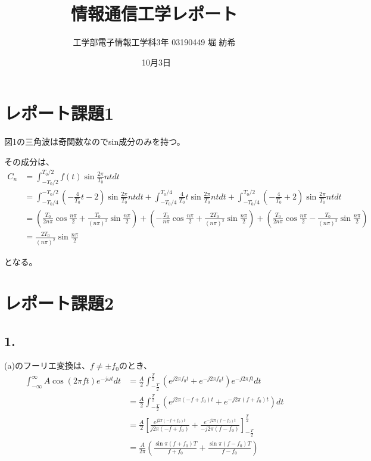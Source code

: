 \documentclass[dvipdfmx]{jsarticle}
\begin{document}
\title{情報通信工学レポート}
\author{工学部電子情報工学科3年 03190449  堀 紡希}
\date{\ 10月3日}
\maketitle

\section*{レポート課題1}

図1の三角波は奇関数なのでsin成分のみを持つ。

その成分は、
\begin{align*}
C_{n} &= \int _{-T_{0}/2} ^{T_{0}/2} f(t)\sin{\frac{2\pi }{T_{0}}nt dt}\\
&= \int _{-T_{0}/4}^{-T_{0}/2} \left(-\frac{4}{T_{0}}t-2\right)\sin{\frac{2\pi }{T_{0}}nt dt}
+ \int _{-T_{0}/4}^{T_{0}/4} \frac{4}{T_{0}}t\sin{\frac{2\pi }{T_{0}}nt dt}
+ \int _{-T_{0}/4}^{T_{0}/2} \left(-\frac{4}{T_{0}}+2\right)\sin{\frac{2\pi }{T_{0}}nt dt}\\
&= \left( \frac{T_{0}}{2n\pi}\cos{\frac{n\pi}{2}}+\frac{T_{0}}{(n\pi)^{2}}\sin{\frac{n\pi}{2}} \right) + \left(-\frac{T_{0}}{n\pi}\cos{\frac{n\pi}{2}}+\frac{2T_{0}}{(n\pi)^{2}}\sin{\frac{n\pi}{2}}\right) + \left(\frac{T_{0}}{2n\pi}\cos{\frac{n\pi}{2}}-\frac{T_{0}}{(n\pi)^{2}}\sin{\frac{n\pi}{2}}\right)\\
&= \frac{2T_{0}}{(n\pi)^{2}}\sin{\frac{n\pi}{2}}
\end{align*}

となる。
\section*{レポート課題2}
\subsection*{1.}

(a)のフーリエ変換は、$f\neq \pm f_{0}$のとき、
\begin{align*}
\int _{-\infty } ^{\infty } A\cos{(2\pi ft)} e^{-j\omega t}dt&= \frac{A}{2}\int _{-\frac{T}{2} } ^{\frac{T}{2} } (e^{j2\pi f_{0}t}+e^{-j2\pi f_{0}t}) e^{-j 2\pi f t}dt \\
&= \frac{A}{2}\int _{-\frac{T}{2} } ^{\frac{T}{2} } (e^{j2\pi (-f+f_{0})t}+e^{-j2\pi (f+f_{0})t})dt \\
&= \frac{A}{2}\left[ \frac{e^{j2\pi (-f+f_{0})t}}{j2\pi (-f+f_{0})}+\frac{e^{-j2\pi (f-f_{0})t}}{-j2\pi (f-f_{0})} \right]^{\frac{T}{2}} _{-\frac{T}{2}}\\
&=\frac{A}{2\pi}\left( \frac{\sin{\pi (f+f_{0})T}}{f+f_{0}} + \frac{\sin{\pi (f-f_{0})T}}{f-f_{0}}\right)
\end{align*}
\end{document}
